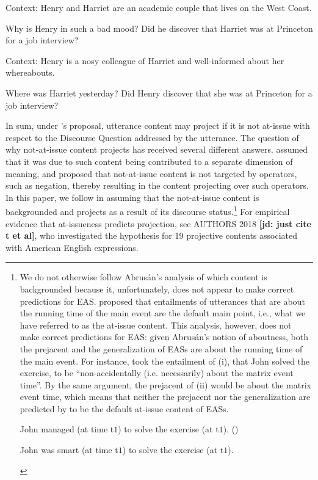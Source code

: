 \documentclass[11pt,fleqn]{article}
\newcommand{\6}{\mbox{$[\hspace*{-.6mm}[$}}
\newcommand{\9}{\mbox{$]\hspace*{-.6mm}]$}}
\newcommand{\citepos}[1]{\citeauthor{#1}'s \citeyear{#1}}
\newcommand{\jd}[1]{\textbf{\color{red}[jd: #1]}}
\begin{document}
\begin{exe}
\ex\label{discover3}
\begin{xlist}

\ex Context: Henry and Harriet are an academic couple that lives on the West Coast. 
\begin{xlist}
 Why is Henry in such a bad mood?
 Did he discover that Harriet was at Princeton for a job interview?
\end{xlist}

\ex Context: Henry is a nosy colleague of Harriet and well-informed about her whereabouts.
\begin{xlist}
 Where was Harriet yesterday?
 Did Henry discover that she was at Princeton for a job interview?
\end{xlist}

\end{xlist}
\end{exe}
In sum, under \citepos{best-question} proposal, utterance content may project if it is not at-issue with respect to the Discourse Question addressed by the utterance. The question of why not-at-issue content projects has received several different answers. \citet{potts05} assumed that it was due to such content being contributed to a separate dimension of meaning, and \citet{brst-salt10} proposed that not-at-issue content is not targeted by operators, such as negation, thereby resulting in the content projecting over such operators. In this paper, we follow \citealt{abrusan2011,abrusan2016} in assuming that the not-at-issue content is backgrounded and projects as a result of its discourse status.\footnote{We do not otherwise follow Abrus\'an's analysis of which content is backgrounded because it, unfortunately, does not appear to make correct predictions for EAS. \citet{abrusan2011} proposed that entailments of utterances that are about the running time of the main event are the default main point, i.e., what we have referred to as the at-issue content. This analysis, however, does not make correct predictions for EAS: given Abrus\'an's notion of aboutness, both the prejacent and the generalization of EASs are about the running time of the main event. For instance, \citet[508]{abrusan2011} took the entailment of (i), that John solved the exercise, to be ``non-accidentally (i.e. necessarily) about the matrix event time''. By the same argument, the prejacent of (ii) would be about the matrix event time, which means that neither the prejacent nor the generalization are predicted by \citealt{abrusan2011} to be the default at-issue content of EASs.

\begin{exe}
 John managed (at time t$ {\mbox{1}}$) to solve the exercise (at t$ {\mbox{1}}$). \hfill (\citealt[508]{abrusan2011})

 John was smart (at time t$ {\mbox{1}}$) to solve the exercise (at t$ {\mbox{1}}$).

\end{exe}} For empirical evidence that at-issueness predicts projection, see AUTHORS 2018 \jd{just cite t et al}, who investigated the hypothesis for 19 projective contents associated with American English expressions. 
\end{document}
